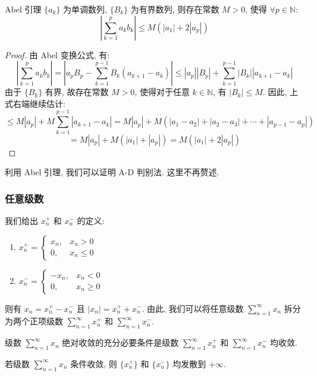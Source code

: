 \documentclass[a4paper,12pt]{ctexart}
\begin{document}
\begin{mylemma}{Abel 引理}{}
$\{a_k\}$ 为单调数列, $\{B_k\}$ 为有界数列, 则存在常数 $M > 0$, 使得 $\forall p \in \mathbb{N}$:
$$
\left| \sum_{k=1}^{p} a_k b_k \right| \leq M (|a_1|+2|a_p|)
$$
\end{mylemma}

\begin{proof}
由 Abel 变换公式, 有:
$$
\left| \sum_{k=1}^{p} a_k b_k \right| = \left| a_p B_p - \sum_{k=1}^{p-1} B_k (a_{k+1} - a_k) \right| \leq |a_p||B_p| + \sum_{k=1}^{p-1} |B_k| |a_{k+1} - a_k|
$$
由于 $\{B_k\}$ 有界, 故存在常数 $M > 0$, 使得对于任意 $k \in \mathbb{N}$, 有 $|B_k| \leq M$. 因此, 上式右端继续估计:
$$
\leq M |a_p| + M \sum_{k=1}^{p-1} |a_{k+1} - a_k| = M |a_p| + M (|a_1 - a_2| + |a_2 - a_3| + \cdots + |a_{p-1} - a_p|)
$$
$$
= M |a_p| + M (|a_1| + |a_p|) = M (|a_1| + 2 |a_p|)
$$
\end{proof}

利用 Abel 引理, 我们可以证明 A-D 判别法. 这里不再赘述.

\newpage

\subsubsection{任意级数}

\begin{mydef}{}{}
我们给出 $x_n^+$ 和 $x_n^-$ 的定义:
\begin{enumerate}
    \item $x_n^+ = \begin{cases} x_n, & x_n > 0 \\ 0, & x_n \leq 0 \end{cases}$
    \item $x_n^- = \begin{cases} -x_n, & x_n < 0 \\ 0, & x_n \geq 0 \end{cases}$
\end{enumerate}
则有 $x_n = x_n^+ - x_n^-$ 且 $|x_n| = x_n^+ + x_n^-$. 由此, 我们可以将任意级数 $\sum_{n=1}^{\infty} x_n$ 拆分为两个正项级数 $\sum_{n=1}^{\infty} x_n^+$ 和 $\sum_{n=1}^{\infty} x_n^-$.
\end{mydef}

\begin{mythm}{}{}
级数 $\sum_{n=1}^{\infty} x_n$ 绝对收敛的充分必要条件是级数 $\sum_{n=1}^{\infty} x_n^+$ 和 $\sum_{n=1}^{\infty} x_n^-$ 均收敛.
\end{mythm}

\begin{mythm}{}{}
若级数 $\sum_{n=1}^{\infty} x_n$ 条件收敛, 则 $\{x_n^+\}$ 和 $\{x_n^-\}$ 均发散到 $+\infty$.
\end{mythm}
\end{document}
